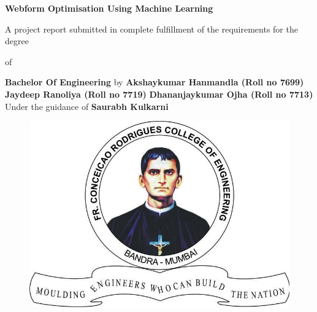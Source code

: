 \documentclass[12pt]{report}
\begin{document}
\begin{center}
\begin{large}
\textbf{ Webform  Optimisation Using Machine Learning }
\end{large}
\end{center}
\vspace*{30px}
\begin{center}
A project report submitted in complete fulfillment of the requirements for the degree
\begin{center}
\hspace*{-80px}of
\end{center}
\hspace*{30px} \textbf{ Bachelor Of Engineering }
\newline
\newline
\hspace*{50px}by
\newline
\newline
\newline
\hspace*{30px} \textbf{Akshaykumar Hanmandla (Roll no 7699)}
\newline
\hspace*{30px} \textbf{Jaydeep Ranoliya (Roll no 7719)}
\newline
\hspace*{30px} \textbf{Dhananjaykumar Ojha (Roll no 7713)}
\newline
\newline
\newline
\newline
\hspace*{50px} Under the guidance of 
\newline
\hspace*{60px}\textbf{Saurabh Kulkarni}
\newline
\newline
\begin{center}
\begin{figure}[!ht]
\hspace*{125px}\includegraphics[scale=0.3]{crcelogo.jpg}
\end{figure}
\end{center}
\end{center}
\end{document}
